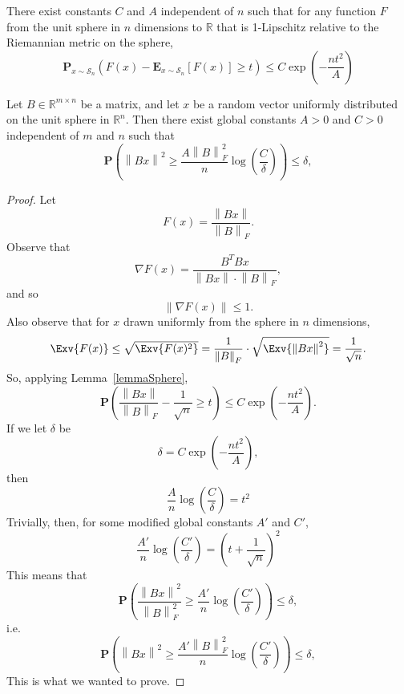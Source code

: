 \begin{toappendix}    
\begin{lemma}
There exist constants $C$ and $A$ independent of $n$ such that for any function $F$ from the unit sphere in $n$ dimensions to $\mathbb{R}$ that is 1-Lipschitz relative to the Riemannian metric on the sphere,
\[
    \mathbf{P}_{x \sim \mathcal{S}_n}\left( F(x) - \mathbf{E}_{x \sim \mathcal{S}_n}[F(x)] \ge t \right) \le C \exp\left( -\frac{n t^2}{A} \right)
\]
\label{lemmaSphere}
\end{lemma}

\begin{lemma}
    Let $B \in \mathbb{R}^{m \times n}$ be a matrix, and let $x$ be a random vector uniformly distributed on the unit sphere in $\mathbb{R}^n$. Then there exist global constants $A > 0$ and $C > 0$ independent of $m$ and $n$ such that
    \[
        \mathbf{P}\left( \left\|Bx\right\|^2 \ge \frac{A \left\|B\right\|_F^2}{n} \log\left( \frac{C}{\delta} \right) \right) \le \delta,
    \]
    \label{lemmaOneStep}
\end{lemma}
\begin{proof}
Let
\[
    F(x) = \frac{\left\|Bx\right\|}{\left\|B\right\|_F}.
\]
Observe that
\[
    \nabla F(x) = \frac{B^T B x}{\left\|B x\right\| \cdot \left\|B\right\|_F},
\]
and so
\[
    \left\|\nabla F(x)\right\| \le 1.
\]
Also observe that for $x$ drawn uniformly from the sphere in $n$ dimensions,
\[
    \Exv{F(x)} \le \sqrt{\Exv{F(x)^2}} = \frac{1}{\left\|B\right\|_F} \cdot \sqrt{\Exv{ \left\|B x\right\|^2 }} =
    \frac{1}{\sqrt{n}}.
\]
So, applying Lemma~\ref{lemmaSphere},
\[
    \mathbf{P}\left( \frac{\left\|Bx\right\|}{\left\|B\right\|_F} - \frac{1}{\sqrt{n}} \ge t \right) \le C \exp\left( -\frac{n t^2}{A} \right).
\]
If we let $\delta$ be
\[
    \delta = C \exp\left( -\frac{n t^2}{A} \right),
\]
then
\[
    \frac{A}{n} \log\left( \frac{C}{\delta} \right) = t^2
\]
Trivially, then, for some modified global constants $A'$ and $C'$,
\[
    \frac{A'}{n} \log\left( \frac{C'}{\delta} \right) = \left(t + \frac{1}{\sqrt{n}} \right)^2
\]
This means that
\[
    \mathbf{P}\left( \frac{\left\|Bx\right\|^2}{\left\|B\right\|_F^2} \ge \frac{A'}{n} \log\left( \frac{C'}{\delta} \right) \right) \le \delta,
\]
i.e.
\[
    \mathbf{P}\left( \left\|Bx\right\|^2 \ge \frac{A' \left\|B\right\|_F^2}{n} \log\left( \frac{C'}{\delta} \right) \right) \le \delta,
\]
This is what we wanted to prove.
\end{proof}
\end{toappendix}

